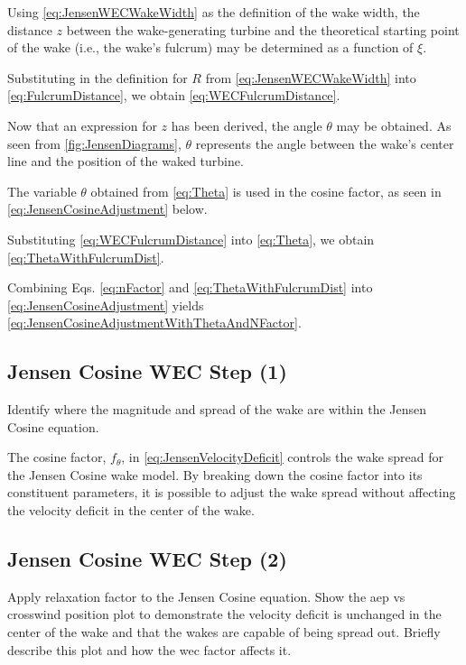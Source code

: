 \documentclass[a4paper]{jpconf}
\begin{document}
Using \cref{eq:JensenWECWakeWidth} as the definition of the wake width, the distance $z$ between the wake-generating turbine and the theoretical starting point of the wake (i.e., the wake's fulcrum) may be determined as a function of $\xi$.

Substituting in the definition for $R$ from \cref{eq:JensenWECWakeWidth} into \cref{eq:FulcrumDistance}, we obtain \cref{eq:WECFulcrumDistance}.



Now that an expression for $z$ has been derived, the angle $\theta$ may be obtained. As seen from \cref{fig:JensenDiagrams}, $\theta$ represents the angle between the wake's center line and the position of the waked turbine.

The variable $\theta$ obtained from \cref{eq:Theta} is used in the cosine factor, as seen in \cref{eq:JensenCosineAdjustment} below.

Substituting \cref{eq:WECFulcrumDistance} into \cref{eq:Theta}, we obtain \cref{eq:ThetaWithFulcrumDist}.



Combining Eqs. \cref{eq:nFactor} and \cref{eq:ThetaWithFulcrumDist} into \cref{eq:JensenCosineAdjustment} yields \cref{eq:JensenCosineAdjustmentWithThetaAndNFactor}.





\subsection{Jensen Cosine WEC Step (1)}
Identify where the magnitude and spread of the wake are within the Jensen Cosine equation.

The cosine factor, $f_\theta$, in \cref{eq:JensenVelocityDeficit} controls the wake spread for the Jensen Cosine wake model. By breaking down the cosine factor into its constituent parameters, it is possible to adjust the wake spread without affecting the velocity deficit in the center of the wake.

\subsection{Jensen Cosine WEC Step (2)}
Apply relaxation factor to the Jensen Cosine equation. Show the aep vs crosswind position plot to demonstrate the velocity deficit is unchanged in the center of the wake and that the wakes are capable of being spread out. Briefly describe this plot and how the wec factor affects it.
\end{document}
